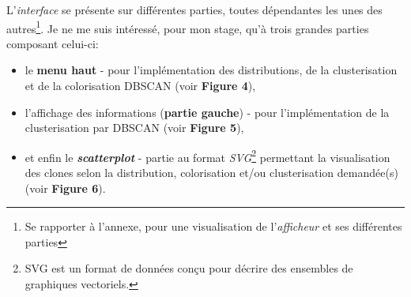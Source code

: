 \documentclass[pdftex,12pt,a4paper]{report}
\begin{document}
\begin{spacing}{1.2}
L'\textit{interface} se présente sur différentes parties, toutes dépendantes les unes des autres\footnote{Se rapporter à l'annexe, pour une visualisation de l'\textit{afficheur} et ses différentes parties}.
\newline Je ne me suis intéressé, pour mon stage, qu'à trois grandes parties composant celui-ci:
\begin{itemize}
\item{le \textbf{menu haut} - pour l'implémentation des distributions, de la clusterisation et de la colorisation DBSCAN (voir \textbf{Figure 4}),}
\item{l'affichage des informations (\textbf{partie gauche}) - pour l'implémentation de la clusterisation par DBSCAN (voir \textbf{Figure 5}),}
\item{et enfin le \textbf{\textit{scatterplot}} - partie au format \textit{SVG}\footnote{SVG est un format de données conçu pour décrire des ensembles de graphiques vectoriels.} permettant la visualisation des clones selon la distribution, colorisation et/ou clusterisation demandée(s) (voir \textbf{Figure 6}).}
\end{itemize}


\end{spacing}
\end{document}
